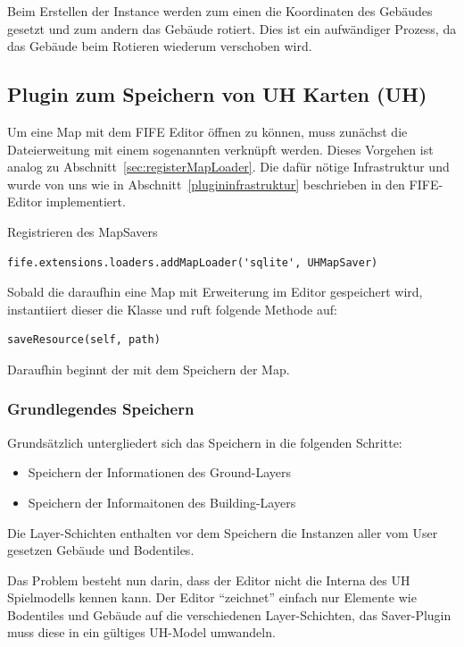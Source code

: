 Beim Erstellen der Instance werden zum einen die Koordinaten des Gebäudes
gesetzt und zum andern das Gebäude rotiert. Dies ist ein aufwändiger
Prozess, da das Gebäude beim Rotieren wiederum verschoben wird.


\subsection{Plugin zum Speichern von UH Karten (UH)}
Um eine Map mit dem FIFE Editor öffnen zu können, muss
zunächst die Dateierweitung mit einem sogenannten  verknüpft
werden. Dieses Vorgehen ist analog zu Abschnitt~\ref{sec:registerMapLoader}. Die
dafür nötige Infrastruktur und wurde von uns wie in
Abschnitt~\ref{plugininfrastruktur} beschrieben in den FIFE-Editor
implementiert.

Registrieren des MapSavers

\begin{lstlisting}
fife.extensions.loaders.addMapLoader('sqlite', UHMapSaver)
\end{lstlisting}

Sobald die daraufhin eine Map mit  Erweiterung im Editor
gespeichert wird, instantiiert dieser die  Klasse und ruft
folgende Methode auf:

\begin{lstlisting}
saveResource(self, path)
\end{lstlisting}

Daraufhin beginnt der  mit dem Speichern der Map.

\subsubsection{Grundlegendes Speichern}
Grundsätzlich untergliedert sich das Speichern in die folgenden Schritte:
\begin{itemize}
  \item Speichern der Informationen des Ground-Layers
  \item Speichern der Informaitonen des Building-Layers
\end{itemize}

Die Layer-Schichten enthalten vor dem Speichern die Instanzen aller vom User
gesetzen Gebäude und Bodentiles.

Das Problem besteht nun darin, dass der Editor nicht die
Interna des UH Spielmodells kennen kann. Der Editor ``zeichnet'' einfach nur
Elemente wie Bodentiles und Gebäude auf die verschiedenen Layer-Schichten, das
Saver-Plugin muss diese in ein gültiges UH-Model umwandeln.

